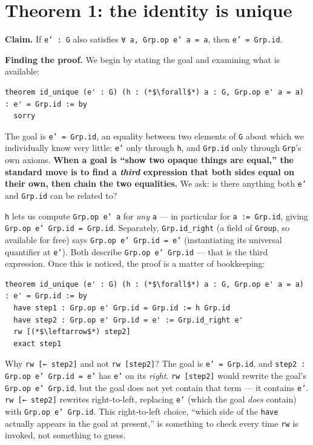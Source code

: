 \section{Theorem 1: the identity is unique}\label{sec:07-group-theorems:02-theorem-1:1}

\textbf{Claim.} If \texttt{e' : G} also satisfies \texttt{∀ a, Grp.op e' a = a}, then \texttt{e' = Grp.id}.

\textbf{Finding the proof.} We begin by stating the goal and examining what is available:

\begin{lstlisting}
theorem id_unique (e' : G) (h : (*$\forall$*) a : G, Grp.op e' a = a) : e' = Grp.id := by
  sorry
\end{lstlisting}

The goal is \texttt{e' = Grp.id}, an equality between two elements of \texttt{G} about which we individually know very little: \texttt{e'} only through \texttt{h}, and \texttt{Grp.id} only through \texttt{Grp}'s own axioms. \textbf{When a goal is ``show two opaque things are equal,'' the standard move is to find a \emph{third} expression that both sides equal on their own, then chain the two equalities.} We ask: is there anything both \texttt{e'} and \texttt{Grp.id} can be related to?

\texttt{h} lets us compute \texttt{Grp.op e' a} for \emph{any} \texttt{a} --- in particular for \texttt{a := Grp.id}, giving \texttt{Grp.op e' Grp.id = Grp.id}. Separately, \texttt{Grp.id\_\allowbreak{}right} (a field of \texttt{Group}, so available for free) says \texttt{Grp.op e' Grp.id = e'} (instantiating its universal quantifier at \texttt{e'}). Both describe \texttt{Grp.op e' Grp.id} --- that is the third expression. Once this is noticed, the proof is a matter of bookkeeping:

\begin{lstlisting}
theorem id_unique (e' : G) (h : (*$\forall$*) a : G, Grp.op e' a = a) : e' = Grp.id := by
  have step1 : Grp.op e' Grp.id = Grp.id := h Grp.id
  have step2 : Grp.op e' Grp.id = e' := Grp.id_right e'
  rw [(*$\leftarrow$*) step2]
  exact step1
\end{lstlisting}

Why \texttt{rw [← step2]} and not \texttt{rw [step2]}? The goal is \texttt{e' = Grp.id}, and \texttt{step2 : Grp.op e' Grp.id = e'} has \texttt{e'} on its \emph{right}. \texttt{rw [step2]} would rewrite the goal's \texttt{Grp.op e' Grp.id}, but the goal does not yet contain that term --- it contains \texttt{e'}. \texttt{rw [← step2]} rewrites right-to-left, replacing \texttt{e'} (which the goal \emph{does} contain) with \texttt{Grp.op e' Grp.id}. This right-to-left choice, ``which side of the \texttt{have} actually appears in the goal at present,'' is something to check every time \texttt{rw} is invoked, not something to guess.

